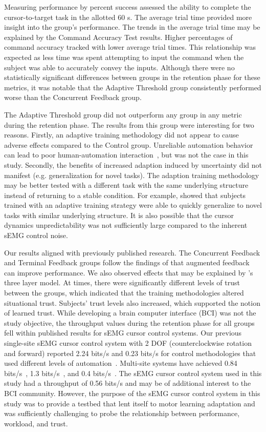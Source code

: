 Measuring performance by percent success assessed the ability to complete the cursor-to-target task in the allotted 60 s.
The average trial time provided more insight into the group's performance.
The trends in the average trial time may be explained by the Command Accuracy Test results.
Higher percentages of command accuracy tracked with lower average trial times.
This relationship was expected as less time was spent attempting to input the command when the subject was able to accurately convey the inputs.
Although there were no statistically significant differences between groups in the retention phase for these metrics, it was notable that the Adaptive Threshold group consistently performed worse than the Concurrent Feedback group.

The Adaptive Threshold group did not outperform any group in any metric during the retention phase.
The results from this group were interesting for two reasons.
Firstly, an adaptive training methodology did not appear to cause adverse effects compared to the Control group.
Unreliable automation behavior can lead to poor human-automation interaction~\citep{RN54}, but was not the case in this study.
Secondly, the benefits of increased adaption induced by uncertainty did not manifest (e.g. generalization for novel tasks).
The adaption training methodology may be better tested with a different task with the same underlying structure instead of returning to a stable condition.
For example, \citeauthor{RN36} showed that subjects trained with an adaptive training strategy were able to quickly generalize to novel tasks with similar underlying structure.
It is also possible that the cursor dynamics unpredictability was not sufficiently large compared to the inherent sEMG control noise.

Our results aligned with previously published research.
The Concurrent Feedback and Terminal Feedback groups follow the findings of \citeauthor{RN27} that augmented feedback can improve performance.
We also observed effects that may be explained by \citeauthor{RN39}'s three layer model.
At times, there were significantly different levels of trust between the groups, which indicated that the training methodologies altered situational trust.
Subjects' trust levels also increased, which supported the notion of learned trust.
While developing a brain computer interface (BCI) was not the study objective, the throughput values during the retention phase for all groups fell within published results for sEMG cursor control systems.
Our previous single-site sEMG cursor control system with 2 DOF (counterclockwise rotation and forward) reported 2.24 bits/s and 0.23 bits/s for control methodologies that used different levels of automation~\citep{RN45}.
Multi-site systems have achieved 0.84 bits/s~\citep{RN55}, 1.3 bits/s~\citep{RN56}, and 0.4 bits/s~\citep{RN57}.
The sEMG cursor control system used in this study had a throughput of 0.56 bits/s and may be of additional interest to the BCI community.
However, the purpose of the sEMG cursor control system in this study was to provide a testbed that lent itself to motor learning adaptation and was sufficiently challenging to probe the relationship between performance, workload, and trust.

